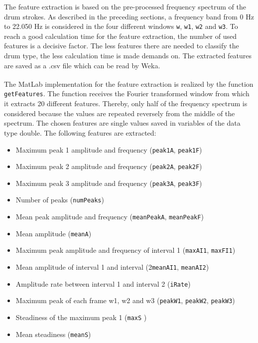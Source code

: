 The feature extraction is based on the pre-processed frequency spectrum of the drum strokes. As described in the preceding sections, a frequency band from 0 Hz to 22.050 Hz is considered in the four different windows \lstinline{w}, \lstinline{w1}, \lstinline{w2} and \lstinline{w3}. To reach a good calculation time for the feature extraction, the number of used features is a decisive factor. The less features there are needed to classify the drum type, the less calculation time is made demands on. The extracted features are saved as a .csv file which can be read by Weka. 

The MatLab\textsuperscript{\textregistered} implementation for the feature extraction is realized by the function \lstinline{getFeatures}. The function receives the Fourier transformed window from which it extracts 20 different features. Thereby, only half of the frequency spectrum is considered because the values are repeated reversely from the middle of the spectrum. The chosen features are single values saved in variables of the data type double. The following features are extracted:

\begin{itemize} 
	\item Maximum peak 1 amplitude and frequency (\lstinline{peak1A}, \lstinline{peak1F})
	\item Maximum peak 2 amplitude and frequency (\lstinline{peak2A}, \lstinline{peak2F})
	\item Maximum peak 3 amplitude and frequency (\lstinline{peak3A}, \lstinline{peak3F})
	\item Number of peaks (\lstinline{numPeaks})
	\item Mean peak amplitude and frequency (\lstinline{meanPeakA}, \lstinline{meanPeakF})
	\item Mean amplitude (\lstinline{meanA})
	\item Maximum peak amplitude and frequency of interval 1 (\lstinline{maxAI1}, \lstinline{maxFI1})
	\item Mean amplitude of interval 1 and interval (2\lstinline{meanAI1}, \lstinline{meanAI2})
	\item Amplitude rate between interval 1 and interval 2 (\lstinline{iRate})
	\item Maximum peak of each frame w1, w2 and w3 (\lstinline{peakW1}, \lstinline{peakW2}, \lstinline{peakW3})
	\item Steadiness of the maximum peak 1 (\lstinline{maxS}	)
	\item Mean steadiness (\lstinline{meanS})
\end{itemize}

